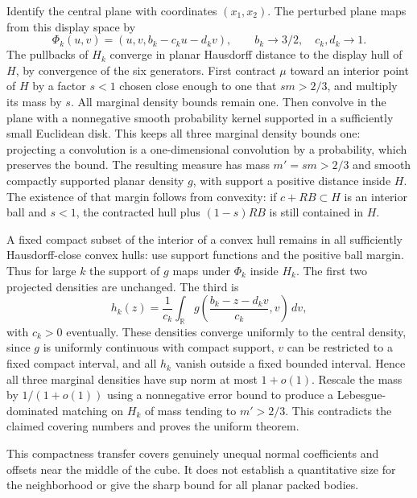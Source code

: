 \documentclass[
  10pt,
]{article}
\begin{document}
Identify the central plane with coordinates \((x_1,x_2)\). The perturbed
plane maps from this display space by \[
 \Phi_k(u,v)=(u,v,b_k-c_k u-d_k v),\qquad b_k\to3/2,\quad c_k,d_k\to1.
\] The pullbacks of \(H_k\) converge in planar Hausdorff distance to the
display hull of \(H\), by convergence of the six generators. First
contract \(\mu\) toward an interior point of \(H\) by a factor \(s<1\)
chosen close enough to one that \(sm>2/3\), and multiply its mass by
\(s\). All marginal density bounds remain one. Then convolve in the
plane with a nonnegative smooth probability kernel supported in a
sufficiently small Euclidean disk. This keeps all three marginal density
bounds one: projecting a convolution is a one-dimensional convolution by
a probability, which preserves the bound. The resulting measure has mass
\(m'=sm>2/3\) and smooth compactly supported planar density \(g\), with
support a positive distance inside \(H\). The existence of that margin
follows from convexity: if \(c+RB\subset H\) is an interior ball and
\(s<1\), the contracted hull plus \((1-s)RB\) is still contained in
\(H\).

A fixed compact subset of the interior of a convex hull remains in all
sufficiently Hausdorff-close convex hulls: use support functions and the
positive ball margin. Thus for large \(k\) the support of \(g\) maps
under \(\Phi_k\) inside \(H_k\). The first two projected densities are
unchanged. The third is \[
 h_k(z)=\frac1{c_k}\int_{\mathbb R}g\!\left(\frac{b_k-z-d_k v}{c_k},v\right)\,dv,
\] with \(c_k>0\) eventually. These densities converge uniformly to the
central density, since \(g\) is uniformly continuous with compact
support, \(v\) can be restricted to a fixed compact interval, and all
\(h_k\) vanish outside a fixed bounded interval. Hence all three
marginal densities have sup norm at most \(1+o(1)\). Rescale the mass by
\(1/(1+o(1))\) using a nonnegative error bound to produce a
Lebesgue-dominated matching on \(H_k\) of mass tending to \(m'>2/3\).
This contradicts the claimed covering numbers and proves the uniform
theorem.

This compactness transfer covers genuinely unequal normal coefficients
and offsets near the middle of the cube. It does not establish a
quantitative size for the neighborhood or give the sharp bound for all
planar packed bodies.
\end{document}
